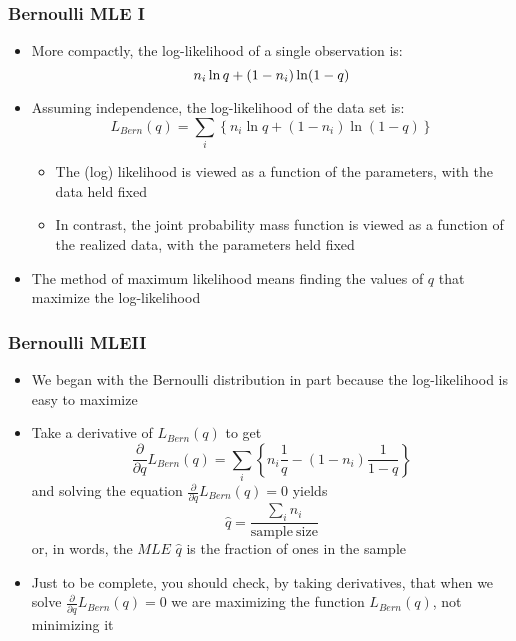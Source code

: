 \documentclass{beamer}
\begin{document}
\begin{frame}[shrink=2]
 \frametitle{Bernoulli MLE I}
 \begin{itemize}
\item More compactly, the log-likelihood of a single observation is:
\begin{equation*}
n_i \ln q + (1-n_i)\ln ( 1-q ) \vspace{2mm}
\end{equation*}
\item Assuming independence, the log-likelihood of the data set is:
\begin{equation*}
L_{Bern}(q)=\sum_i \left\{ n_i \ln q + (1-n_i)\ln ( 1-q ) \right\}
\end{equation*} \vspace{2mm}
 \begin{itemize}
\item The (log) likelihood is viewed as a function of the parameters, with the data held
fixed \vspace{2mm}
\item In contrast, the joint probability mass  function is viewed as a function of the realized data,
with the parameters held fixed \vspace{2mm}
\end{itemize}
\item The method of maximum likelihood means finding the values of $q$ that maximize the log-likelihood
\end{itemize}
\end{frame}

\begin{frame}[shrink=2]
 \frametitle{Bernoulli MLEII}
 \begin{itemize}
\item We began with the Bernoulli distribution in part because the log-likelihood is easy to
maximize \vspace{2mm}
\item Take a derivative of $L_{Bern}(q)$ to get
\begin{equation*}
\frac{\partial}{\partial q} L_{Bern}(q)=\sum_i \left\{ n_i \frac{1}{q} - (1-n_i)\frac{1}{1-q} \right\}
\end{equation*}
and solving the equation $\frac{\partial}{\partial q} L_{Bern}(q) =0$ yields
\begin{equation*}
\hat{q} = \frac{\sum_i n_i}{\mathrm{sample ~size}}
\end{equation*}
  or, in words, the $MLE$ $\hat{q}$ is the fraction of ones in the
  sample \vspace{2mm}
\item Just to be complete, you should check, by taking derivatives, that when we solve  $\frac{\partial}{\partial q} L_{Bern}(q) =0$ we are maximizing the function $L_{Bern}(q)$, not minimizing it
\end{itemize}
\end{frame}
\end{document}
